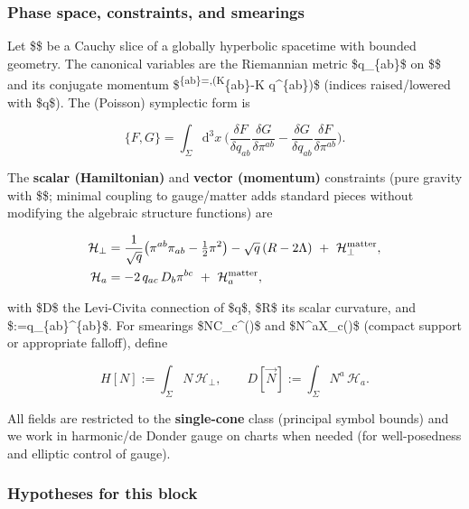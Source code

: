 \documentclass[
]{article}
\numberwithin{equation}{section}
\begin{document}
\hypertarget{phase-space-constraints-and-smearings}{%
\subsubsection{Phase space, constraints, and
smearings}\label{phase-space-constraints-and-smearings}}

Let \$\Sigma\$ be a Cauchy slice of a globally hyperbolic spacetime with
bounded geometry. The canonical variables are the Riemannian metric
\$q\_\{ab\}\$ on \$\Sigma\$ and its conjugate momentum
\$\pi\textsuperscript{\{ab\}=,(K}\{ab\}-K q\^{}\{ab\})\$
(indices raised/lowered with \$q\$). The (Poisson) symplectic form is

\[
\{F,G\}=\int_\Sigma\!\mathrm d^3x\ \Big(\frac{\delta F}{\delta q_{ab}}\frac{\delta G}{\delta \pi^{ab}}-\frac{\delta G}{\delta q_{ab}}\frac{\delta F}{\delta \pi^{ab}}\Big).
\]

The \textbf{scalar (Hamiltonian)} and \textbf{vector (momentum)}
constraints (pure gravity with \$\Lambda\$; minimal coupling to
gauge/matter adds standard pieces without modifying the algebraic
structure functions) are

\[
\begin{aligned}
\mathcal H_\perp &= \frac{1}{\sqrt{q}}\big(\pi^{ab}\pi_{ab}-\tfrac12\pi^2\big)-\sqrt{q}\,(R-2\Lambda)\ +\ \mathcal H_\perp^{\rm matter},\\
\mathcal H_a &= -2\,q_{ac}\,D_b\pi^{bc}\ +\ \mathcal H_a^{\rm matter},
\end{aligned}
\]

with \$D\$ the Levi-Civita connection of \$q\$, \$R\$ its scalar
curvature, and \$\pi:=q\_\{ab\}\pi\^{}\{ab\}\$. For smearings
\$N\in C\_c\^{}\infty(\Sigma)\$ and \$N\^{}a\in\mathfrak X\_c(\Sigma)\$
(compact support or appropriate falloff), define

\[
H[N]:=\int_\Sigma\! N\,\mathcal H_\perp,\qquad D[\vec N]:=\int_\Sigma\! N^a\,\mathcal H_a.
\]

All fields are restricted to the \textbf{single-cone} class (principal
symbol bounds) and we work in harmonic/de Donder gauge on charts when
needed (for well-posedness and elliptic control of gauge).

\hypertarget{hypotheses-for-this-block}{%
\subsubsection{Hypotheses for this
block}\label{hypotheses-for-this-block}}
\end{document}
